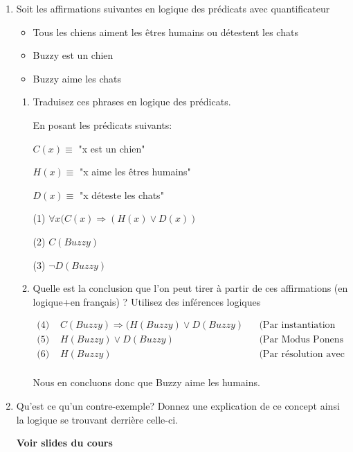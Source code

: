 \documentclass[A4paper,11pt]{article}
\begin{document}
\begin{enumerate}
    \item Soit les affirmations suivantes en logique des prédicats avec quantificateur
    \begin{itemize}
        \item Tous les chiens aiment les êtres humains ou détestent les chats
        \item Buzzy est un chien
        \item Buzzy aime les chats
    \end{itemize}
    \begin{enumerate}
        \item Traduisez ces phrases en logique des prédicats.
        
        En posant les prédicats suivants:
        
        $C(x) \equiv$ "x est un chien"
        
        $H(x) \equiv$ "x aime les êtres humains"
        
        $D(x) \equiv$ "x déteste les chats"
        
        (1) $\forall x (C(x) \Rightarrow (H(x) \lor D(x))$
        
        (2) $C(Buzzy)$
        
        (3) $\neg D(Buzzy)$
        \item Quelle est la conclusion que l'on peut tirer à partir de ces affirmations (en logique+en français) ? Utilisez des inférences logiques
        
        \begin{align*}
            \text{(4) }& C(Buzzy) \Rightarrow (H(Buzzy) \lor D(Buzzy) && \text{(Par instantiation universelle)}\\
            \text{(5) }& H(Buzzy) \lor D(Buzzy) && \text{(Par Modus Ponens avec (2) et (4))}\\
            \text{(6) }& H(Buzzy) && \text{(Par résolution avec (3) et (5))}\\
        \end{align*}
        
        Nous en concluons donc que Buzzy aime les humains.
    \end{enumerate}
    \item Qu'est ce qu'un contre-exemple? Donnez une explication de ce concept ainsi la logique se trouvant derrière celle-ci.
    
    \textbf{Voir slides du cours}
\end{enumerate}
\end{document}
